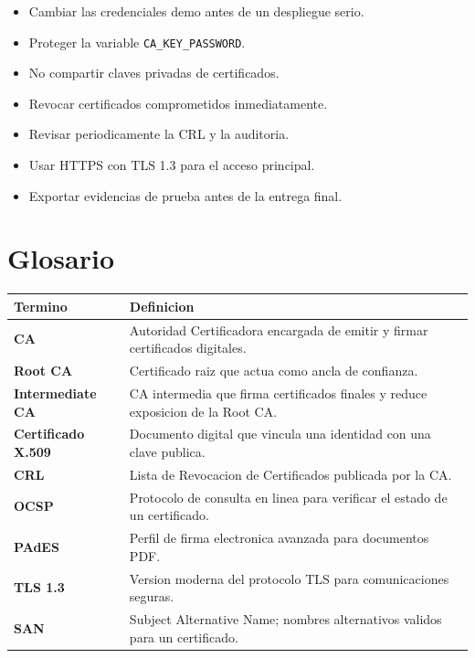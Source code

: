 \documentclass[12pt,a4paper]{article}
\begin{document}
\begin{itemize}[leftmargin=*]
    \item Cambiar las credenciales demo antes de un despliegue serio.
    \item Proteger la variable \texttt{CA\_KEY\_PASSWORD}.
    \item No compartir claves privadas de certificados.
    \item Revocar certificados comprometidos inmediatamente.
    \item Revisar periodicamente la CRL y la auditoria.
    \item Usar HTTPS con TLS 1.3 para el acceso principal.
    \item Exportar evidencias de prueba antes de la entrega final.
\end{itemize}

\section{Glosario}

\begin{longtable}{>{\bfseries}p{4cm}p{10cm}}
\toprule
Termino & Definicion \\
\midrule
CA & Autoridad Certificadora encargada de emitir y firmar certificados digitales. \\
Root CA & Certificado raiz que actua como ancla de confianza. \\
Intermediate CA & CA intermedia que firma certificados finales y reduce exposicion de la Root CA. \\
Certificado X.509 & Documento digital que vincula una identidad con una clave publica. \\
CRL & Lista de Revocacion de Certificados publicada por la CA. \\
OCSP & Protocolo de consulta en linea para verificar el estado de un certificado. \\
PAdES & Perfil de firma electronica avanzada para documentos PDF. \\
TLS 1.3 & Version moderna del protocolo TLS para comunicaciones seguras. \\
SAN & Subject Alternative Name; nombres alternativos validos para un certificado. \\
\bottomrule
\end{longtable}
\end{document}
